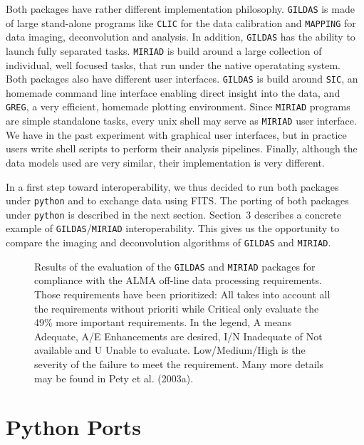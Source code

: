 \documentclass[11pt,twoside]{article}  %
\newcommand{\GILDAS}{\texttt{GILDAS}}
\newcommand{\MIRIAD}{\texttt{MIRIAD}}
\newcommand{\python}{\texttt{python}}
\newcommand{\SIC}{\texttt{SIC}}
\newcommand{\GREG}{\texttt{GREG}}
\newcommand{\CLIC}{\texttt{CLIC}}
\newcommand{\MAPPING}{\texttt{MAPPING}}
\newcommand{\ALMA}{\textrm{ALMA}}
\begin{document}
Both packages have rather different implementation philosophy. \GILDAS{} is
made of large stand-alone programs like \CLIC{} for the data calibration
and \MAPPING{} for data imaging, deconvolution and analysis. In addition,
\GILDAS{} has the ability to launch fully separated tasks. \MIRIAD{} is
build around a large collection of individual, well focused tasks, that
run under the native operatating system.  Both
packages also have different user interfaces. \GILDAS{} is build around
\SIC{}, an homemade command line interface enabling direct insight into the
data, and \GREG{}, a very efficient, homemade plotting environment. 
Since \MIRIAD{} programs are simple standalone tasks, every
unix shell may serve as \MIRIAD{} user interface.  We have in the past
experiment with graphical user interfaces, but in practice users
write shell scripts to perform their analysis pipelines.
Finally, although the data models used are very similar, their
implementation is very different.

In a first step toward interoperability, we thus decided to run both
packages under \python{} and to exchange data using FITS.  The porting of both
packages under \python{} is described in the next section. Section~3 describes
a concrete example of \GILDAS{}/\MIRIAD{} interoperability. This gives us
the opportunity to compare the imaging and deconvolution algorithms of
\GILDAS{} and \MIRIAD{}.

\begin{figure}
  \centering
  \caption{Results of the evaluation of the \GILDAS{} and \MIRIAD{}
    packages for compliance with the \ALMA{} off-line data processing
    requirements. Those requirements have been prioritized: All takes into
    account all the requirements without prioriti while Critical only
    evaluate the 49\% more important requirements. In the legend, A means
    Adequate, A/E Enhancements are desired, I/N Inadequate of Not available
    and U Unable to evaluate.  Low/Medium/High is the severity of the
    failure to meet the requirement.  Many more details may be found in
    Pety et al. (2003a).}
  \label{fig:P4-14_1}
\end{figure}

\section{Python Ports}
\end{document}
